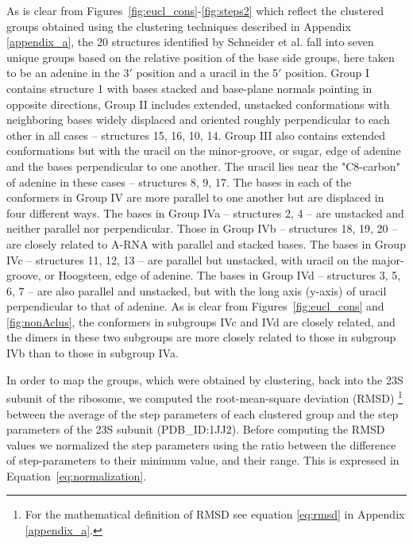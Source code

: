 As  is clear  from  Figures~\ref{fig:eucl_cons}-\ref{fig:steps2} which
reflect the clustered groups  obtained using the clustering techniques
described in  Appendix \ref{appendix_a}, the  20 structures identified
by  Schneider et  al.   fall into  seven  unique groups  based on  the
relative position of the base side groups, here taken to be an adenine
in  the 3$'$  position and  a uracil  in the  5$'$ position.   Group I
contains  structure  {1} with  bases  stacked  and base-plane  normals
pointing in opposite directions, Group II includes extended, unstacked
conformations  with neighboring  bases widely  displaced  and oriented
roughly perpendicular  to each other  in all cases --  structures {15,
  16, 10, 14}. Group III also contains extended conformations but with
the uracil  on the minor-groove, or sugar,  edge \cite{leontis1998} of
adenine and the  bases perpendicular to one another.   The uracil lies
near the  "C8-carbon" of adenine in  these cases --  structures {8, 9,
  17}.   The bases  in each  of the  conformers in  Group IV  are more
parallel to one another but are displaced in four different ways.  The
bases in Group  IVa -- structures {2, 4} --  are unstacked and neither
parallel nor perpendicular.  Those in Group IVb -- structures {18, 19,
  20} -- are closely related to A-RNA with parallel and stacked bases.
The bases in Group IVc --  structures {11, 12, 13} -- are parallel but
unstacked,   with   uracil   on   the  major-groove,   or   Hoogsteen,
\cite{leontis1998}  edge  of  adenine.   The  bases in  Group  IVd  --
structures {3, 5,  6, 7} -- are also parallel  and unstacked, but with
the long axis (y-axis) of uracil perpendicular to that of adenine.  As
is clear from  Figures~\ref{fig:eucl_cons} and \ref{fig:nonAclus}, the
conformers  in subgroups  IVc and  IVd  are closely  related, and  the
dimers in  these two  subgroups are more  closely related to  those in
subgroup IVb than to those in subgroup IVa.

In order  to map the groups,  which were obtained  by clustering, back
into the 23S subunit of the ribosome, we computed the root-mean-square
deviation (RMSD) \footnote{For the mathematical definition of RMSD see
  equation \ref{eq:rmsd} in Appendix \ref{appendix_a}.} between the
average of  the step parameters of  each clustered group  and the step
parameters of  the 23S  subunit (PDB\_ID:1JJ2).  Before  computing the
RMSD values we normalized the  step parameters using the ratio between
the difference  of step-parameters to  their minimum value,  and their
range.  This is expressed in Equation~\ref{eq:normalization}.

